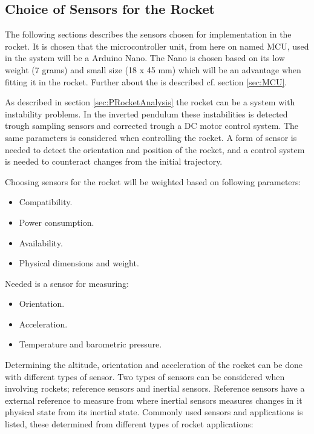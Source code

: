 \startexplain
{}
\stopexplain


\subsection{Choice of Sensors for the Rocket}  \label{sec:Rocket_sensor_choice}

The following sections describes the sensors chosen for implementation in the rocket. It is chosen that the microcontroller unit, from here on named MCU, used in the system will be a Arduino Nano. The Nano is chosen based on its low weight (7 grams) and small size (18 x 45 mm) which will be an advantage when fitting it in the rocket. Further about the  is described cf. section \ref{sec:MCU}.    

As described in section \ref{sec:PRocketAnalysis} the rocket can be a system with instability problems. In the inverted pendulum these instabilities is detected trough sampling sensors and corrected trough a DC motor control system. The same parameters is considered when controlling the rocket. A form of sensor is needed to detect the orientation and position of the rocket, and a control system is needed to counteract changes from the initial trajectory.

Choosing sensors for the rocket will be weighted based on following parameters:

\begin{itemize}[noitemsep]
\item Compatibility.
\item Power consumption.
\item Availability. 
\item Physical dimensions and weight.
\end{itemize}

Needed is a sensor for measuring:
\begin{itemize}[noitemsep]
\item Orientation.
\item Acceleration.
\item Temperature and barometric pressure.
\end{itemize}

Determining the altitude, orientation and acceleration of the rocket can be done with different types of sensor. Two types of sensors can be considered when involving rockets; reference sensors and inertial sensors. Reference sensors have a external reference to measure from where inertial sensors measures changes in it physical state from its inertial state. Commonly used sensors and applications is listed, these determined from different types of rocket applications:

